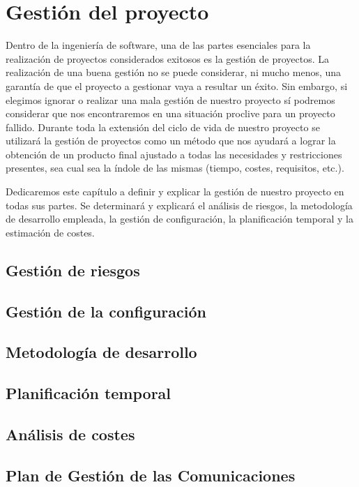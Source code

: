 \chapter{Gestión del proyecto}

Dentro de la ingeniería de software, una de las partes esenciales para la realización de proyectos considerados exitosos es la gestión de proyectos. La realización de una buena gestión no se puede considerar, ni mucho menos, una garantía de que el proyecto a gestionar vaya a resultar un éxito. Sin embargo, si elegimos ignorar o realizar una mala gestión de nuestro proyecto sí podremos considerar que nos encontraremos en una situación proclive para un proyecto fallido. Durante toda la extensión del ciclo de vida de nuestro proyecto se utilizará la gestión de proyectos como un método que nos ayudará a lograr la obtención de un producto final ajustado a todas las necesidades y restricciones presentes, sea cual sea la índole de las mismas (tiempo, costes, requisitos, etc.).

\bigskip

Dedicaremos este capítulo a definir y explicar la gestión de nuestro proyecto en todas sus partes. Se determinará y explicará el análisis de riesgos, la metodología de desarrollo empleada, la gestión de configuración, la planificación temporal y la estimación de costes.

\section{Gestión de riesgos}


\section{Gestión de la configuración}


\section{Metodología de desarrollo}



\section{Planificación temporal}


\section{Análisis de costes}


\section{Plan de Gestión de las Comunicaciones}

